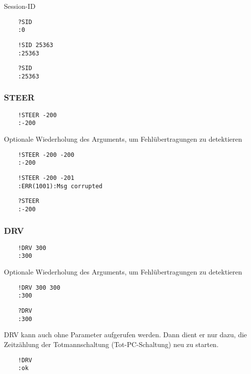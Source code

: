 Session-ID

\begin{verbatim}
	?SID
	:0
\end{verbatim}


\begin{verbatim}
	!SID 25363
	:25363
\end{verbatim}

\begin{verbatim}
	?SID
	:25363
\end{verbatim}


\subsubsection{STEER}

\begin{verbatim}
	!STEER -200
	:-200
\end{verbatim}

Optionale Wiederholung des Arguments, um Fehlübertragungen zu detektieren

\begin{verbatim}
	!STEER -200 -200
	:-200
\end{verbatim}

\begin{verbatim}
	!STEER -200 -201
	:ERR(1001):Msg corrupted
\end{verbatim}

\begin{verbatim}
	?STEER
	:-200
\end{verbatim}


\subsubsection{DRV}

\begin{verbatim}
	!DRV 300
	:300
\end{verbatim}


Optionale Wiederholung des Arguments, um Fehlübertragungen zu detektieren


\begin{verbatim}
	!DRV 300 300
	:300
\end{verbatim}

\begin{verbatim}
	?DRV
	:300
\end{verbatim}


DRV kann auch ohne Parameter aufgerufen werden. Dann dient er nur dazu, die Zeitzählung der Totmannschaltung (\bzw Tot-PC-Schaltung) neu zu starten.
\begin{verbatim}
	!DRV
	:ok
\end{verbatim}


